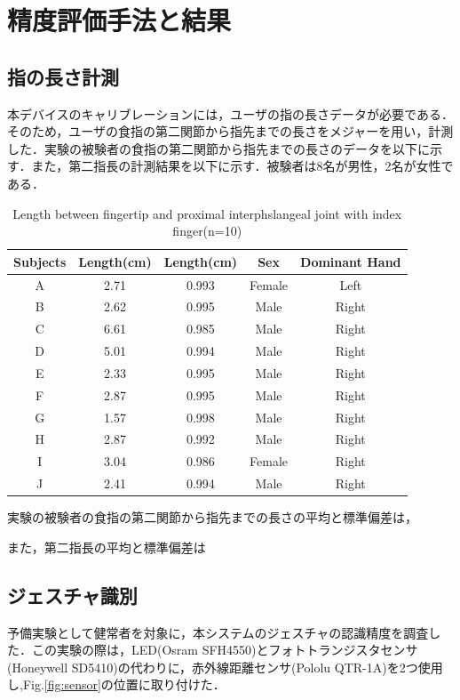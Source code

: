 \chapter{精度評価手法と結果}

\section{指の長さ計測}
本デバイスのキャリブレーションには，ユーザの指の長さデータが必要である．そのため，ユーザの食指の第二関節から指先までの長さをメジャーを用い，計測した．実験の被験者の食指の第二関節から指先までの長さのデータを以下に示す．また，第二指長の計測結果を以下に示す．被験者は8名が男性，2名が女性である．

\begin{table}[H]
  \caption{Length between fingertip and proximal interphslangeal joint with index finger(n=10)}
  \label{table:finger_distance}
  \centering
  \begin{tabular}{ccccc}
    \hline
    Subjects & Length(cm)& Length(cm) & Sex & Dominant Hand\\
    \hline \hline 
    A  & 2.71 & 0.993 & Female & Left\\
    B  & 2.62 & 0.995 & Male & Right\\
    C  & 6.61 & 0.985 & Male & Right\\
    D  & 5.01 & 0.994 & Male & Right\\
    E  & 2.33 & 0.995 & Male & Right\\ 
    F  & 2.87 & 0.995 & Male & Right\\
    G  & 1.57 & 0.998 & Male & Right\\
    H  & 2.87 & 0.992 & Male & Right\\
    I  & 3.04 & 0.986 & Female & Right\\
    J  & 2.41 & 0.994 & Male & Right\\
    \hline
  \end{tabular}
\end{table}

実験の被験者の食指の第二関節から指先までの長さの平均と標準偏差は，

また，第二指長の平均と標準偏差は




\section{ジェスチャ識別}
予備実験として健常者を対象に，本システムのジェスチャの認識精度を調査した．この実験の際は，LED(Osram SFH4550)とフォトトランジスタセンサ(Honeywell SD5410)の代わりに，赤外線距離センサ(Pololu QTR-1A)を2つ使用し,Fig.\ref{fig:sensor}の位置に取り付けた．

